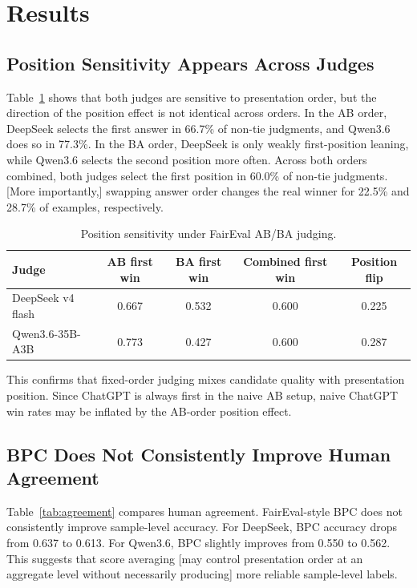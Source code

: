 \documentclass[11pt]{article}
\begin{document}
\section{Results}

\subsection{Position Sensitivity Appears Across Judges}

Table~\ref{tab:position} shows that both judges are sensitive to presentation order, but the direction of the position effect is not identical across orders. In the AB order, DeepSeek selects the first answer in 66.7\% of non-tie judgments, and Qwen3.6 does so in 77.3\%. In the BA order, DeepSeek is only weakly first-position leaning, while Qwen3.6 selects the second position more often. Across both orders combined, both judges select the first position in 60.0\% of non-tie judgments. [More importantly,] swapping answer order changes the real winner for 22.5\% and 28.7\% of examples, respectively.

\begin{table}[h]
\centering
\begin{tabular}{lcccc}
\toprule
Judge & AB first win & BA first win & Combined first win & Position flip \\
\midrule
DeepSeek v4 flash & 0.667 & 0.532 & 0.600 & 0.225 \\
Qwen3.6-35B-A3B & 0.773 & 0.427 & 0.600 & 0.287 \\
\bottomrule
\end{tabular}
\caption{Position sensitivity under FairEval AB/BA judging.}
\label{tab:position}
\end{table}

This confirms that fixed-order judging mixes candidate quality with presentation position. Since ChatGPT is always first in the naive AB setup, naive ChatGPT win rates may be inflated by the AB-order position effect.

\subsection{BPC Does Not Consistently Improve Human Agreement}

Table~\ref{tab:agreement} compares human agreement. FairEval-style BPC does not consistently improve sample-level accuracy. For DeepSeek, BPC accuracy drops from 0.637 to 0.613. For Qwen3.6, BPC slightly improves from 0.550 to 0.562. This suggests that score averaging [may control presentation order at an aggregate level without necessarily producing] more reliable sample-level labels.
\end{document}
